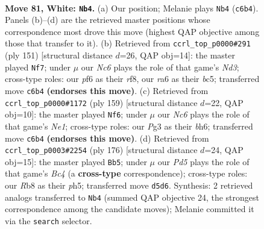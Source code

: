 \documentclass[11pt]{article}
\begin{document}
\clearpage

\begin{figure}[p]\centering
\begin{subfigure}{0.46\textwidth}\centering
\resizebox{\linewidth}{!}{%
\newchessgame
\chessboard[
  setfen={1R6/6p1/r1N2pk1/3P3p/7P/6P1/5K2/8 w - - 1 81},
  showmover=false,
  pgfstyle=straightmove, color=movearrow, markmove={c6-b4}
]}
\caption{}
\end{subfigure}\hfill
\begin{subfigure}{0.46\textwidth}\centering
\resizebox{\linewidth}{!}{%
\newchessgame
\chessboard[
  setfen={5R2/1r4p1/3nk3/2B1p2p/7P/2N3PK/8/8 b - - 11 76},
  showmover=false,
  pgfstyle=straightmove, color=movearrow, markmove={d6-f7}
]}
\caption{}
\end{subfigure}
\\[4pt]
\begin{subfigure}{0.46\textwidth}\centering
\resizebox{\linewidth}{!}{%
\newchessgame
\chessboard[
  setfen={R3n3/3r1k1p/6pB/8/6PP/5PK1/8/8 b - - 20 80},
  showmover=false,
  pgfstyle=straightmove, color=movearrow, markmove={e8-f6}
]}
\caption{}
\end{subfigure}\hfill
\begin{subfigure}{0.46\textwidth}\centering
\resizebox{\linewidth}{!}{%
\newchessgame
\chessboard[
  setfen={8/8/5kp1/5p1p/2B2P1P/r2N4/5KP1/8 w - - 13 89},
  showmover=false,
  pgfstyle=straightmove, color=movearrow, markmove={c4-b5}
]}
\caption{}
\end{subfigure}
\caption{\textbf{Move 81, White: \texttt{Nb4}.} (a) Our position; Melanie plays \texttt{Nb4} (\texttt{c6b4}). Panels (b)--(d) are the retrieved master positions whose correspondence most drove this move (highest QAP objective among those that transfer to it). (b) Retrieved from \texttt{ccrl\_top\_p0000\#291} (ply 151) [structural distance $d$=26, QAP obj=14]: the master played \texttt{Nf7}; under $\mu$ our \emph{Nc6} plays the role of that game's \emph{Nd3}; cross-type roles: our \emph{p}f6 as their \emph{r}f8, our \emph{r}a6 as their \emph{b}c5; transferred move \texttt{c6b4} \textbf{(endorses this move)}. (c) Retrieved from \texttt{ccrl\_top\_p0000\#1172} (ply 159) [structural distance $d$=22, QAP obj=10]: the master played \texttt{Nf6}; under $\mu$ our \emph{Nc6} plays the role of that game's \emph{Ne1}; cross-type roles: our \emph{P}g3 as their \emph{b}h6; transferred move \texttt{c6b4} \textbf{(endorses this move)}. (d) Retrieved from \texttt{ccrl\_top\_p0003\#2254} (ply 176) [structural distance $d$=24, QAP obj=15]: the master played \texttt{Bb5}; under $\mu$ our \emph{Pd5} plays the role of that game's \emph{Bc4} (a \textbf{cross-type} correspondence); cross-type roles: our \emph{R}b8 as their \emph{p}h5; transferred move \texttt{d5d6}. Synthesis: 2 retrieved analogs transferred to \texttt{Nb4} (summed QAP objective 24, the strongest correspondence among the candidate moves); Melanie committed it via the \texttt{search} selector.}
\label{fig:thought-m160}
\end{figure}
\end{document}
